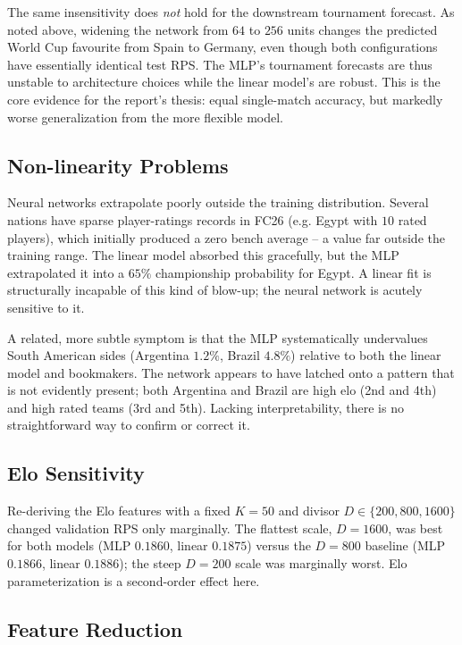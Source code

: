 \documentclass{article}
\begin{document}
The same insensitivity does \emph{not} hold for the downstream tournament forecast. As noted above, widening the network from $64$ to $256$ units changes the predicted World Cup favourite from Spain to Germany, even though both configurations have essentially identical test RPS. The MLP's tournament forecasts are thus unstable to architecture choices while the linear model's are robust. This is the core evidence for the report's thesis: equal single-match accuracy, but markedly worse generalization from the more flexible model.

\subsection{Non-linearity Problems}

Neural networks extrapolate poorly outside the training distribution. Several nations have sparse player-ratings records in FC26 (e.g. Egypt with $10$ rated players), which initially produced a zero bench average -- a value far outside the training range. The linear model absorbed this gracefully, but the MLP extrapolated it into a $65\%$ championship probability for Egypt. A linear fit is structurally incapable of this kind of blow-up; the neural network is acutely sensitive to it.

A related, more subtle symptom is that the MLP systematically undervalues South American sides (Argentina $1.2\%$, Brazil $4.8\%$) relative to both the linear model and bookmakers. The network appears to have latched onto a pattern that is not evidently present; both Argentina and Brazil are high elo (2nd and 4th) and high rated teams (3rd and 5th). Lacking interpretability, there is no straightforward way to confirm or correct it.

\subsection{Elo Sensitivity}
\label{sec:elo}

Re-deriving the Elo features with a fixed $K=50$ and divisor $D\in\{200,800,1600\}$ changed validation RPS only marginally. The flattest scale, $D=1600$, was best for both models (MLP $0.1860$, linear $0.1875$) versus the $D=800$ baseline (MLP $0.1866$, linear $0.1886$); the steep $D=200$ scale was marginally worst. Elo parameterization is a second-order effect here.

\subsection{Feature Reduction}
\label{sec:reduction}
\end{document}

